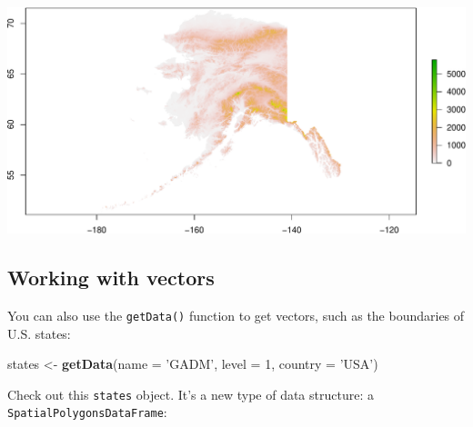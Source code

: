 \documentclass[]{book}
\newenvironment{Shaded}{\begin{snugshade}}{\end{snugshade}}
\newcommand{\DataTypeTok}[1]{\textcolor[rgb]{0.13,0.29,0.53}{#1}}
\newcommand{\DecValTok}[1]{\textcolor[rgb]{0.00,0.00,0.81}{#1}}
\newcommand{\KeywordTok}[1]{\textcolor[rgb]{0.13,0.29,0.53}{\textbf{#1}}}
\newcommand{\NormalTok}[1]{#1}
\newcommand{\StringTok}[1]{\textcolor[rgb]{0.31,0.60,0.02}{#1}}
\begin{document}
\includegraphics{figures/unnamed-chunk-640-1.pdf}

\hypertarget{working-with-vectors}{%
\subsection*{Working with vectors}\label{working-with-vectors}}

You can also use the \texttt{getData()} function to get vectors, such as the boundaries of U.S. states:

\begin{Shaded}
\begin{Highlighting}[]
\NormalTok{states <-}\StringTok{ }\KeywordTok{getData}\NormalTok{(}\DataTypeTok{name =} \StringTok{'GADM'}\NormalTok{, }\DataTypeTok{level =} \DecValTok{1}\NormalTok{, }\DataTypeTok{country =} \StringTok{'USA'}\NormalTok{)}
\end{Highlighting}
\end{Shaded}

Check out this \texttt{states} object. It's a new type of data structure: a \texttt{SpatialPolygonsDataFrame}:
\end{document}
